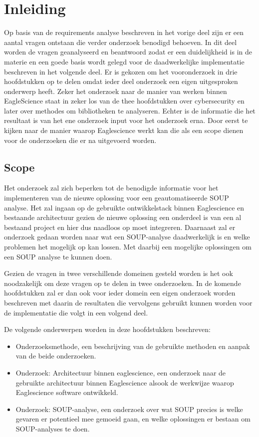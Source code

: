 
\chapter{Inleiding}\label{ch:inleiding3} %


\label{inOnderzoek} %
Op basis van de requirements analyse beschreven in het vorige deel zijn er een aantal vragen ontstaan die verder onderzoek benodigd behoeven.
In dit deel worden de vragen geanalyseerd en beantwoord zodat er een duidelijkheid is in de materie en een goede basis wordt gelegd voor de daadwerkelijke implementatie beschreven in het volgende deel. Er is gekozen om het vooronderzoek in drie hoofdstukken op te delen omdat ieder deel onderzoek een eigen uitgesproken onderwerp heeft. Zeker het onderzoek naar de manier van werken binnen EagleScience staat in zeker los van de thee hoofdstukken over cybersecurity en later over methodes om bibliotheken te analyseren. Echter is de informatie die het resultaat is van het ene onderzoek input voor het onderzoek erna. Door eerst te kijken naar de manier waarop Eaglescience werkt kan die als een scope dienen voor de onderzoeken die er na uitgevoerd worden.


\section{Scope}\label{sec:scope}
Het onderzoek zal zich beperken tot de benodigde informatie voor het implementeren van de nieuwe oplossing voor een geautomatiseerde SOUP analyse.
Het zal ingaan op de gebruikte ontwikkelstack binnen Eaglescience en bestaande architectuur gezien de nieuwe oplossing een onderdeel is van een al bestaand project en hier dus naadloos op moet integreren.
Daarnaast zal er onderzoek gedaan worden naar wat een SOUP-analyse daadwerkelijk is en welke problemen het mogelijk op kan lossen.
Met daarbij een mogelijke oplossingen om een SOUP analyse te kunnen doen.

Gezien de vragen in twee verschillende domeinen gesteld worden is het ook noodzakelijk om deze vragen op te delen in twee onderzoeken.
In de komende hoofdstukken zal er dan ook voor ieder domein een eigen onderzoek worden beschreven met daarin de resultaten die vervolgens gebruikt kunnen worden voor de implementatie die volgt in een volgend deel.

De volgende onderwerpen worden in deze hoofdstukken beschreven:
\begin{itemize}
    \item Onderzoeksmethode, een beschrijving van de gebruikte methoden en aanpak van de beide onderzoeken.
    \item Onderzoek: Architectuur binnen eaglescience, een onderzoek naar de gebruikte architectuur binnen Eaglescience alsook de werkwijze waarop Eaglescience software ontwikkeld.
    \item Onderzoek: SOUP-analyse, een onderzoek over wat SOUP precies is welke gevaren er potentieel mee gemoeid gaan, en welke oplossingen er bestaan om SOUP-analyses te doen.
\end{itemize}
